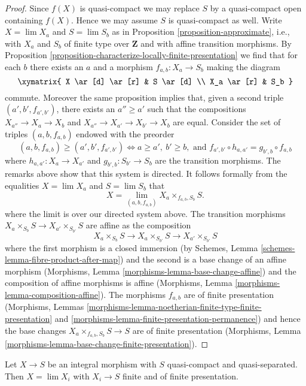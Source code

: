 \begin{proof}
Since $f(X)$ is quasi-compact we may replace $S$ by a quasi-compact
open containing $f(X)$. Hence we may assume $S$ is quasi-compact as well.
Write $X = \lim X_a$ and $S = \lim S_b$ as in
Proposition \ref{proposition-approximate}, i.e., with $X_a$ and $S_b$
of finite type over $\mathbf{Z}$ and with affine transition morphisms.
By Proposition \ref{proposition-characterize-locally-finite-presentation}
we find that for each $b$ there exists an $a$ and a morphism
$f_{a, b} : X_a \to S_b$ making the diagram
$$
\xymatrix{
X \ar[d] \ar[r] & S \ar[d] \\
X_a \ar[r] & S_b
}
$$
commute. Moreover the same proposition implies that, given a second
triple $(a', b', f_{a', b'})$, there exists an $a'' \geq a'$ such that
the compositions $X_{a''} \to X_a \to X_b$ and
$X_{a''} \to X_{a'} \to X_{b'} \to X_b$ are equal.
Consider the set of triples $(a, b, f_{a, b})$ endowed with the preorder
$$
(a, b, f_{a, b}) \geq (a', b', f_{a', b'})
\Leftrightarrow
a \geq a',\ b' \geq b,\text{ and }
f_{a', b'} \circ h_{a, a'} = g_{b', b} \circ f_{a, b}
$$
where $h_{a, a'} : X_a \to X_{a'}$ and $g_{b', b} : S_{b'} \to S_b$
are the transition morphisms. The remarks above show that this system
is directed. It follows formally from the equalities
$X = \lim X_a$ and $S = \lim S_b$ that
$$
X = \lim_{(a, b, f_{a, b})} X_a \times_{f_{a, b}, S_b} S.
$$
where the limit is over our directed system above. The transition morphisms
$X_a \times_{S_b} S \to X_{a'} \times_{S_{b'}} S$ are affine as
the composition
$$
X_a \times_{S_b} S \to X_a \times_{S_{b'}} S \to X_{a'} \times_{S_{b'}} S
$$
where the first morphism is a closed immersion (by
Schemes, Lemma \ref{schemes-lemma-fibre-product-after-map})
and the second is a base change of an affine morphism
(Morphisms, Lemma \ref{morphisms-lemma-base-change-affine})
and the composition of affine morphisms is affine
(Morphisms, Lemma \ref{morphisms-lemma-composition-affine}).
The morphisms $f_{a, b}$ are of finite presentation
(Morphisms, Lemmas
\ref{morphisms-lemma-noetherian-finite-type-finite-presentation} and
\ref{morphisms-lemma-finite-presentation-permanence})
and hence the base changes $X_a \times_{f_{a, b}, S_b} S \to S$
are of finite presentation
(Morphisms, Lemma \ref{morphisms-lemma-base-change-finite-presentation}).
\end{proof}

\begin{lemma}
\label{lemma-integral-limit-finite-and-finite-presentation}
Let $X \to S$ be an integral morphism with $S$ quasi-compact and
quasi-separated. Then $X = \lim X_i$ with $X_i \to S$ finite and
of finite presentation.
\end{lemma}


